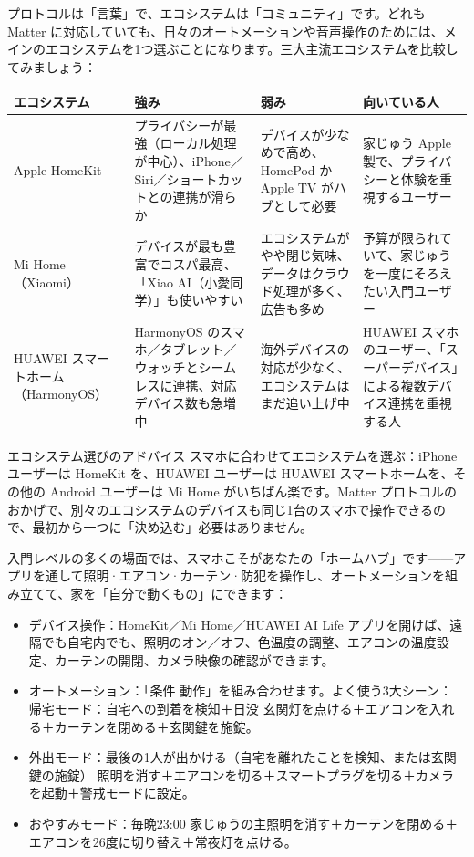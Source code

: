 
プロトコルは「言葉」で、エコシステムは「コミュニティ」です。どれも Matter に対応していても、日々のオートメーションや音声操作のためには、メインのエコシステムを1つ選ぶことになります。三大主流エコシステムを比較してみましょう：

\begin{center}
\begin{tabularx}{\linewidth}{|X|X|X|X|}
\hline
\textbf{エコシステム} & \textbf{強み} & \textbf{弱み} & \textbf{向いている人} \tabularnewline
\hline
Apple HomeKit & プライバシーが最強（ローカル処理が中心）、iPhone／Siri／ショートカットとの連携が滑らか & デバイスが少なめで高め、HomePod か Apple TV がハブとして必要 & 家じゅう Apple 製で、プライバシーと体験を重視するユーザー \tabularnewline
Mi Home（Xiaomi） & デバイスが最も豊富でコスパ最高、「Xiao AI（小愛同学）」も使いやすい & エコシステムがやや閉じ気味、データはクラウド処理が多く、広告も多め & 予算が限られていて、家じゅうを一度にそろえたい入門ユーザー \tabularnewline
HUAWEI スマートホーム（HarmonyOS） & HarmonyOS のスマホ／タブレット／ウォッチとシームレスに連携、対応デバイス数も急増中 & 海外デバイスの対応が少なく、エコシステムはまだ追い上げ中 & HUAWEI スマホのユーザー、「スーパーデバイス」による複数デバイス連携を重視する人 \tabularnewline
\hline
\end{tabularx}
\end{center}

\begin{tcbinfo}{エコシステム選びのアドバイス}
スマホに合わせてエコシステムを選ぶ：iPhone ユーザーは HomeKit を、HUAWEI ユーザーは HUAWEI スマートホームを、その他の Android ユーザーは Mi Home がいちばん楽です。Matter プロトコルのおかげで、別々のエコシステムのデバイスも同じ1台のスマホで操作できるので、最初から一つに「決め込む」必要はありません。

\end{tcbinfo}


入門レベルの多くの場面では、スマホこそがあなたの「ホームハブ」です——アプリを通して照明·エアコン·カーテン·防犯を操作し、オートメーションを組み立てて、家を「自分で動くもの」にできます：

\begin{itemize}
  \item デバイス操作：HomeKit／Mi Home／HUAWEI AI Life アプリを開けば、遠隔でも自宅内でも、照明のオン／オフ、色温度の調整、エアコンの温度設定、カーテンの開閉、カメラ映像の確認ができます。
  \item オートメーション：「条件 動作」を組み合わせます。よく使う3大シーン： 帰宅モード：自宅への到着を検知＋日没 玄関灯を点ける＋エアコンを入れる＋カーテンを閉める＋玄関鍵を施錠。
  \item 外出モード：最後の1人が出かける（自宅を離れたことを検知、または玄関鍵の施錠） 照明を消す＋エアコンを切る＋スマートプラグを切る＋カメラを起動＋警戒モードに設定。
  \item おやすみモード：毎晩23:00 家じゅうの主照明を消す＋カーテンを閉める＋エアコンを26度に切り替え＋常夜灯を点ける。
\end{itemize}

